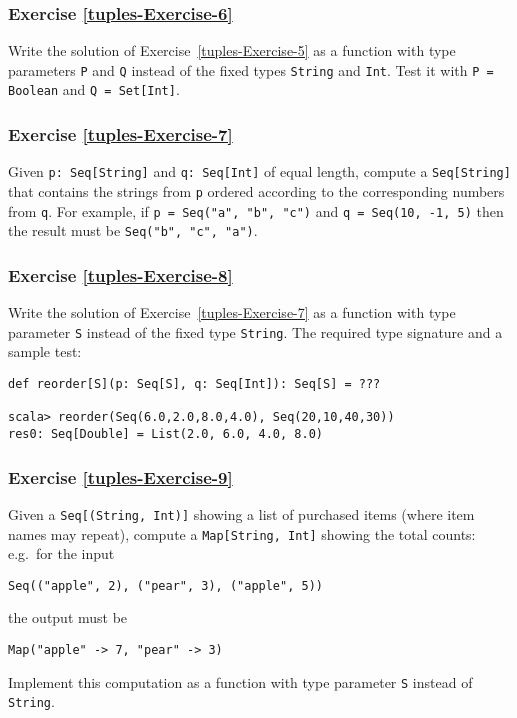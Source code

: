 \subsubsection{Exercise \label{tuples-Exercise-6}\ref{tuples-Exercise-6}}

Write the solution of Exercise~\ref{tuples-Exercise-5} as a function
with type parameters \lstinline!P! and \lstinline!Q! instead of
the fixed types \lstinline!String! and \lstinline!Int!. Test it
with \lstinline!P = Boolean! and \lstinline!Q = Set[Int]!.

\subsubsection{Exercise \label{tuples-Exercise-7}\ref{tuples-Exercise-7}}

Given \lstinline!p: Seq[String]! and \lstinline!q: Seq[Int]! of
equal length, compute a \lstinline!Seq[String]! that contains the
strings from \lstinline!p! ordered according to the corresponding
numbers from \lstinline!q!. For example, if \lstinline!p = Seq("a", "b", "c")!
and \lstinline!q = Seq(10, -1, 5)! then the result must be \lstinline!Seq("b", "c", "a")!.

\subsubsection{Exercise \label{tuples-Exercise-8}\ref{tuples-Exercise-8}}

Write the solution of Exercise~\ref{tuples-Exercise-7} as a function
with type parameter \lstinline!S! instead of the fixed type \lstinline!String!.
The required type signature and a sample test:
\begin{lstlisting}
def reorder[S](p: Seq[S], q: Seq[Int]): Seq[S] = ???

scala> reorder(Seq(6.0,2.0,8.0,4.0), Seq(20,10,40,30))
res0: Seq[Double] = List(2.0, 6.0, 4.0, 8.0)
\end{lstlisting}


\subsubsection{Exercise \label{tuples-Exercise-9}\ref{tuples-Exercise-9}}

Given a \lstinline!Seq[(String, Int)]! showing a list of purchased
items (where item names may repeat), compute a \lstinline!Map[String, Int]!
showing the total counts: e.g.~for the input 
\begin{lstlisting}
Seq(("apple", 2), ("pear", 3), ("apple", 5))
\end{lstlisting}
the output must be 
\begin{lstlisting}
Map("apple" -> 7, "pear" -> 3)
\end{lstlisting}
Implement this computation as a function with type parameter \lstinline!S!
instead of \lstinline!String!. 

